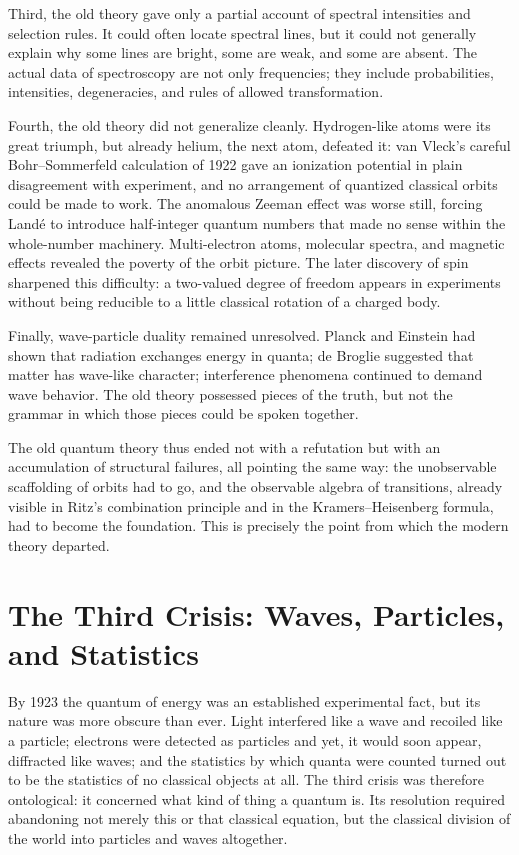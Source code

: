 Third, the old theory gave only a partial account of spectral intensities and selection rules. It could often locate spectral lines, but it could not generally explain why some lines are bright, some are weak, and some are absent. The actual data of spectroscopy are not only frequencies; they include probabilities, intensities, degeneracies, and rules of allowed transformation.

Fourth, the old theory did not generalize cleanly. Hydrogen-like atoms were its great triumph, but already helium, the next atom, defeated it: van Vleck's careful Bohr--Sommerfeld calculation of 1922 gave an ionization potential in plain disagreement with experiment, and no arrangement of quantized classical orbits could be made to work. The anomalous Zeeman effect was worse still, forcing Land\'e to introduce half-integer quantum numbers that made no sense within the whole-number machinery. Multi-electron atoms, molecular spectra, and magnetic effects revealed the poverty of the orbit picture. The later discovery of spin sharpened this difficulty: a two-valued degree of freedom appears in experiments without being reducible to a little classical rotation of a charged body.

Finally, wave-particle duality remained unresolved. Planck and Einstein had shown that radiation exchanges energy in quanta; de Broglie suggested that matter has wave-like character; interference phenomena continued to demand wave behavior. The old theory possessed pieces of the truth, but not the grammar in which those pieces could be spoken together.

The old quantum theory thus ended not with a refutation but with an accumulation of structural failures, all pointing the same way: the unobservable scaffolding of orbits had to go, and the observable algebra of transitions, already visible in Ritz's combination principle and in the Kramers--Heisenberg formula, had to become the foundation. This is precisely the point from which the modern theory departed.

\section{The Third Crisis: Waves, Particles, and Statistics}
By 1923 the quantum of energy was an established experimental fact, but its nature was more obscure than ever. Light interfered like a wave and recoiled like a particle; electrons were detected as particles and yet, it would soon appear, diffracted like waves; and the statistics by which quanta were counted turned out to be the statistics of no classical objects at all. The third crisis was therefore ontological: it concerned what kind of thing a quantum is. Its resolution required abandoning not merely this or that classical equation, but the classical division of the world into particles and waves altogether.

